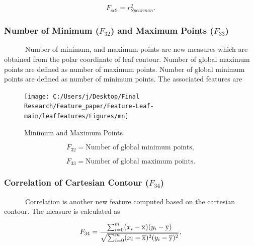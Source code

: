 \documentclass{article}
\begin{document}
\begin{equation}
    F_{sc9} = r^2_{Spearman}.
\end{equation}

\hypertarget{number-of-minimum-f_32-and-maximum-points-f_33}{%
\subsubsection{\texorpdfstring{Number of Minimum (\(F_{32}\)) and
Maximum Points
(\(F_{33}\))}{Number of Minimum (F\_\{32\}) and Maximum Points (F\_\{33\})}}\label{number-of-minimum-f_32-and-maximum-points-f_33}}

~~~~~~Number of minimum, and maximum points are new measures which are
obtained from the polar coordinate of leaf contour. Number of global
maximum points are defined as number of maximum points. Number of global
minimum points are defined as number of minimum points. The associated
features are

\begin{figure}[!ht]

{\centering \texttt{[image: C:/Users/j/Desktop/Final Research/Feature\_paper/Feature-Leaf-main/leaffeatures/Figures/mn]} 

}

\caption{\label{mn}Minimum and Maximum Points}\label{fig:unnamed-chunk-34}
\end{figure}

\begin{equation}
   F_{32} =  \text{Number of global minimum points},
\label{equa_F8}
\end{equation}

\begin{equation}
   F_{33} =  \text{Number of global maximum points}.
\label{equa_F9}
\end{equation}

\hypertarget{correlation-of-cartesian-contour-f_34}{%
\subsubsection{\texorpdfstring{Correlation of Cartesian Contour
(\(F_{34}\))}{Correlation of Cartesian Contour (F\_\{34\})}}\label{correlation-of-cartesian-contour-f_34}}

~~~~~~Correlation is another new feature computed based on the cartesian
contour. The measure is calculated as

\begin{equation}
   F_{34} =  \frac{\sum_{i=0}^{m}(x_i - \overline{\rm x})(y_i - \overline{\rm y})}{\sqrt{\sum_{i=0}^{m} (x_i - \overline{\rm x})^2 (y_i - \overline{\rm y})^2}},
\label{equa_F10}
\end{equation}
\end{document}
